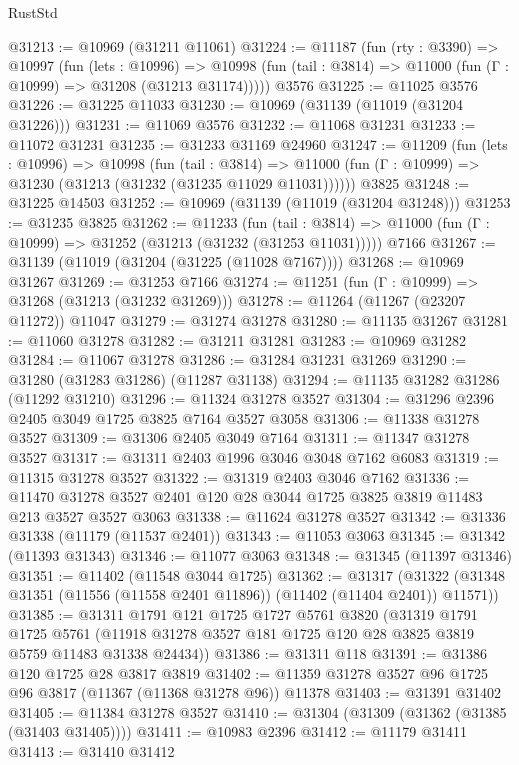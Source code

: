 \begin{lexlean}{RustStd}
\begin{coremodule}
@31213 := @10969 (@31211 @11061)
@31224 := @11187
    (fun (rty : @3390) =>
    @10997
      (fun (lets : @10996) =>
      @10998 (fun (tail : @3814) => @11000 (fun (Γ : @10999) => @31208 (@31213 @31174)))))
    @3576
@31225 := @11025 @3576
@31226 := @31225 @11033
@31230 := @10969 (@31139 (@11019 (@31204 @31226)))
@31231 := @11069 @3576
@31232 := @11068 @31231
@31233 := @11072 @31231
@31235 := @31233 @31169 @24960
@31247 := @11209
    (fun (lets : @10996) =>
    @10998
      (fun (tail : @3814) =>
      @11000 (fun (Γ : @10999) => @31230 (@31213 (@31232 (@31235 @11029 @11031))))))
    @3825
@31248 := @31225 @14503
@31252 := @10969 (@31139 (@11019 (@31204 @31248)))
@31253 := @31235 @3825
@31262 := @11233
    (fun (tail : @3814) => @11000 (fun (Γ : @10999) => @31252 (@31213 (@31232 (@31253 @11031)))))
    @7166
@31267 := @31139 (@11019 (@31204 (@31225 (@11028 @7167))))
@31268 := @10969 @31267
@31269 := @31253 @7166
@31274 := @11251 (fun (Γ : @10999) => @31268 (@31213 (@31232 @31269)))
@31278 := @11264 (@11267 (@23207 @11272)) @11047
@31279 := @31274 @31278
@31280 := @11135 @31267
@31281 := @11060 @31278
@31282 := @31211 @31281
@31283 := @10969 @31282
@31284 := @11067 @31278
@31286 := @31284 @31231 @31269
@31290 := @31280 (@31283 @31286) (@11287 @31138)
@31294 := @11135 @31282 @31286 (@11292 @31210)
@31296 := @11324 @31278 @3527
@31304 := @31296 @2396 @2405 @3049 @1725 @3825 @7164 @3527 @3058
@31306 := @11338 @31278 @3527
@31309 := @31306 @2405 @3049 @7164
@31311 := @11347 @31278 @3527
@31317 := @31311 @2403 @1996 @3046 @3048 @7162 @6083
@31319 := @11315 @31278 @3527
@31322 := @31319 @2403 @3046 @7162
@31336 := @11470 @31278 @3527 @2401 @120 @28 @3044 @1725 @3825 @3819 @11483 @213 @3527 @3527 @3063
@31338 := @11624 @31278 @3527
@31342 := @31336 @31338 (@11179 (@11537 @2401))
@31343 := @11053 @3063
@31345 := @31342 (@11393 @31343)
@31346 := @11077 @3063
@31348 := @31345 (@11397 @31346)
@31351 := @11402 (@11548 @3044 @1725)
@31362 := @31317
    (@31322 (@31348 @31351 (@11556 (@11558 @2401 @11896)) (@11402 (@11404 @2401)) @11571))
@31385 := @31311
    @1791
    @121
    @1725
    @1727
    @5761
    @3820
    (@31319
      @1791
      @1725
      @5761
      (@11918 @31278 @3527 @181 @1725 @120 @28 @3825 @3819 @5759 @11483 @31338 @24434))
@31386 := @31311 @118
@31391 := @31386 @120 @1725 @28 @3817 @3819
@31402 := @11359 @31278 @3527 @96 @1725 @96 @3817 (@11367 (@11368 @31278 @96)) @11378
@31403 := @31391 @31402
@31405 := @11384 @31278 @3527
@31410 := @31304 (@31309 (@31362 (@31385 (@31403 @31405))))
@31411 := @10983 @2396
@31412 := @11179 @31411
@31413 := @31410 @31412

\end{coremodule}
\end{lexlean}
